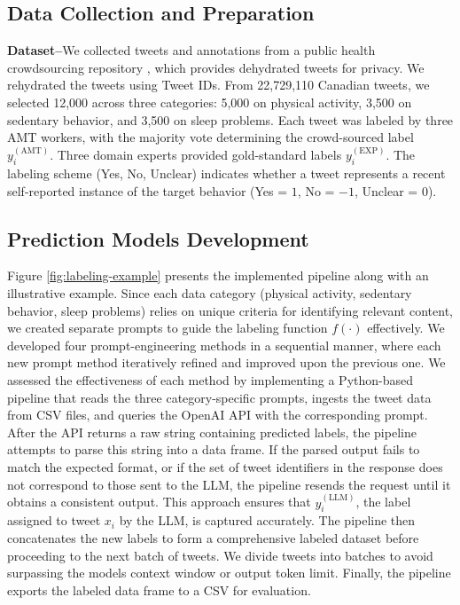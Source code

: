 \documentclass[letterpaper, 10 pt, conference]{ieeeconf} %
\begin{document}
\subsection{Data Collection and Preparation}

{\bf Dataset–}We collected tweets and annotations from a public health crowdsourcing repository \cite{shakeri2022physical}, which provides dehydrated tweets for privacy. We rehydrated the tweets using Tweet IDs. From 22,729,110 Canadian tweets, we selected 12,000 across three categories: 5,000 on physical activity, 3,500 on sedentary behavior, and 3,500 on sleep problems.  
Each tweet was labeled by three AMT workers, with the majority vote determining the crowd-sourced label $y_i^{(\mathrm{AMT})}$. Three domain experts provided gold-standard labels $y_i^{(\mathrm{EXP})}$. The labeling scheme (\textquotesingle{}Yes\textquotesingle{}, \textquotesingle{}No\textquotesingle{}, \textquotesingle{}Unclear\textquotesingle{}) indicates whether a tweet represents a recent self-reported instance of the target behavior (Yes = $1$, No = $-1$, Unclear = $0$).  


\subsection{Prediction Models Development}
\label{sec:models}

Figure \ref{fig:labeling-example} presents the implemented pipeline along with an illustrative example. Since each data category (physical activity, sedentary behavior, sleep problems) relies on unique criteria for identifying relevant content, we created separate prompts to guide the labeling function $f(\cdot)$ effectively. We developed four prompt-engineering methods in a sequential manner, where each new prompt method iteratively refined and improved upon the previous one. We assessed the effectiveness of each method by implementing a Python-based pipeline that reads the three category-specific prompts, ingests the tweet data from CSV files, and queries the OpenAI API with the corresponding prompt. After the API returns a raw string containing predicted labels, the pipeline attempts to parse this string into a data frame. If the parsed output fails to match the expected format, or if the set of tweet identifiers in the response does not correspond to those sent to the LLM, the pipeline resends the request until it obtains a consistent output. This approach ensures that $y_i^{(\mathrm{LLM})}$, the label assigned to tweet $x_i$ by the LLM, is captured accurately. The pipeline then concatenates the new labels to form a comprehensive labeled dataset before proceeding to the next batch of tweets. We divide tweets into batches to avoid surpassing the model\textquotesingle{}s context window or output token limit. Finally, the pipeline exports the labeled data frame to a CSV for evaluation.
\end{document}
